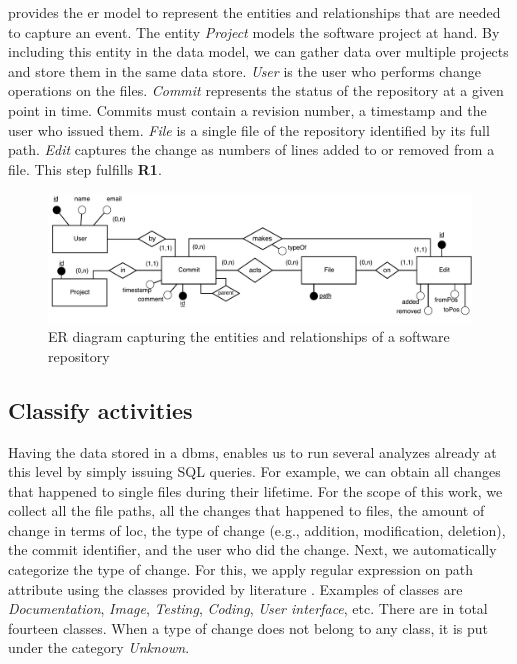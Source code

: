  provides the \gls{er} model to represent the entities and relationships that are needed to capture an event. The entity \textsl{Project} models the software project at hand. By including this entity in the data model, we can gather data over multiple projects and store them in the same data store. \textsl{User} is the user who performs change operations on the files. \textsl{Commit} represents the status of the repository at a given point in time. Commits must contain a revision number, a timestamp and the user who issued them. \textsl{File} is a single file of the repository identified by its full path. \textsl{Edit} captures the change as numbers of lines added to or removed from a file. This step fulfills \textbf{R1}.

\begin{figure}[]
    \centering
    \includegraphics[width=\textwidth]{figures/CommitLogER}
    \caption{ER diagram capturing the entities and relationships of a software repository}
    \label{fig:er-diagram}
\end{figure}


\subsection{Classify activities}


Having the data stored in a \gls{dbms}, enables us to run several analyzes already at this level by simply issuing SQL queries. For example, we can obtain all changes that happened to single files during their lifetime. For the scope of this work, we collect all the file paths, all the changes that happened to files, the amount of change in terms of \gls{loc}, the type of change (e.g., addition, modification, deletion), the commit identifier, and the user who did the change. 
Next, we automatically categorize the type of change. For this, we apply regular expression on path attribute using the classes provided by literature \citep{DBLP:journals/ese/VasilescuSGM14}. 
Examples of classes are  \textsl{Documentation}, \textsl{Image}, \textsl{Testing}, \textsl{Coding}, \textsl{User interface}, etc. There are in total fourteen classes. When a type of change does not belong to any class, it is put under the category \textsl{Unknown}.

